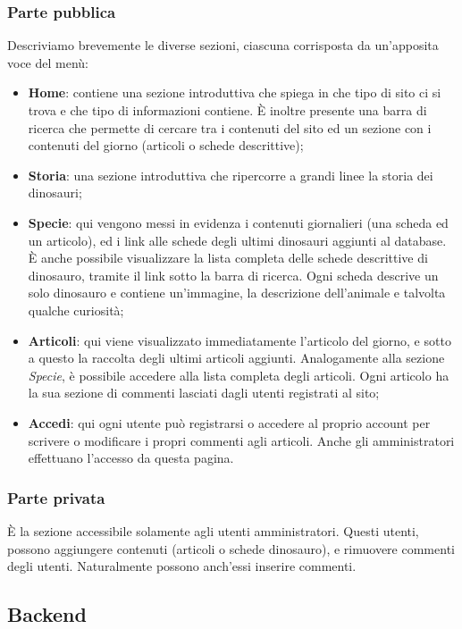 \documentclass[12pt]{article}
\begin{document}
	\subsubsection{Parte pubblica}
	Descriviamo brevemente le diverse sezioni, ciascuna corrisposta da un'apposita voce del menù:
	\begin{itemize}
		\item \textbf{Home}: contiene una sezione introduttiva che spiega in che tipo di sito ci si trova e che tipo di informazioni contiene. È inoltre presente una barra di ricerca che permette di cercare tra i contenuti del sito ed un sezione con i contenuti del giorno (articoli o schede descrittive);
		\item \textbf{Storia}: una sezione introduttiva che ripercorre a grandi linee la storia dei dinosauri;
		\item \textbf{Specie}: qui vengono messi in evidenza i contenuti giornalieri (una scheda ed un articolo), ed i link alle schede degli ultimi dinosauri aggiunti al database. È anche possibile visualizzare la lista completa delle schede descrittive di dinosauro, tramite il link sotto la barra di ricerca. Ogni scheda descrive un solo dinosauro e contiene un'immagine, la descrizione dell'animale e talvolta qualche curiosità;
		\item \textbf{Articoli}: qui viene visualizzato immediatamente l'articolo del giorno, e sotto a questo la raccolta degli ultimi articoli aggiunti. Analogamente alla sezione \textit{Specie}, è possibile accedere alla lista completa degli articoli. Ogni articolo ha la sua sezione di commenti lasciati dagli utenti registrati al sito;
		\item \textbf{Accedi}: qui ogni utente può registrarsi o accedere al proprio account per scrivere o modificare i propri commenti agli articoli.
		Anche gli amministratori effettuano l'accesso da questa pagina.
	\end{itemize}

	\subsubsection{Parte privata}
	È la sezione accessibile solamente agli utenti amministratori. Questi utenti, possono aggiungere contenuti (articoli o schede dinosauro), e rimuovere commenti degli utenti. Naturalmente possono anch'essi inserire commenti.
	
	\subsection{Backend}
	
\end{document}
